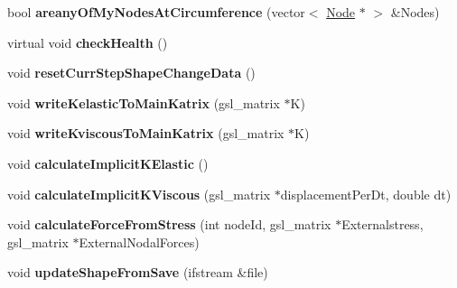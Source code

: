 \begin{DoxyCompactItemize}
\item 
\hypertarget{classShapeBase_ace99764b2dda719995b93cd96ae10b4f}{}bool {\bfseries areany\+Of\+My\+Nodes\+At\+Circumference} (vector$<$ \hyperlink{classNode}{Node} $\ast$ $>$ \&Nodes)\label{classShapeBase_ace99764b2dda719995b93cd96ae10b4f}

\item 
\hypertarget{classShapeBase_adb6927dd05e3f6aa1c5ac5d32a30b5da}{}virtual void {\bfseries check\+Health} ()\label{classShapeBase_adb6927dd05e3f6aa1c5ac5d32a30b5da}

\item 
\hypertarget{classShapeBase_a3c08833714950163efbf15f9b1c26765}{}void {\bfseries reset\+Curr\+Step\+Shape\+Change\+Data} ()\label{classShapeBase_a3c08833714950163efbf15f9b1c26765}

\item 
\hypertarget{classShapeBase_a2bfdde187477364a5a0e2220ea6b2e0e}{}void {\bfseries write\+Kelastic\+To\+Main\+Katrix} (gsl\+\_\+matrix $\ast$K)\label{classShapeBase_a2bfdde187477364a5a0e2220ea6b2e0e}

\item 
\hypertarget{classShapeBase_a388d38c2d6588c7ddf622f1deed53853}{}void {\bfseries write\+Kviscous\+To\+Main\+Katrix} (gsl\+\_\+matrix $\ast$K)\label{classShapeBase_a388d38c2d6588c7ddf622f1deed53853}

\item 
\hypertarget{classShapeBase_a922c41864d4826725cc72089046f818c}{}void {\bfseries calculate\+Implicit\+K\+Elastic} ()\label{classShapeBase_a922c41864d4826725cc72089046f818c}

\item 
\hypertarget{classShapeBase_a20c23d30b7f9f3bc7ed2fde542401aeb}{}void {\bfseries calculate\+Implicit\+K\+Viscous} (gsl\+\_\+matrix $\ast$displacement\+Per\+Dt, double dt)\label{classShapeBase_a20c23d30b7f9f3bc7ed2fde542401aeb}

\item 
\hypertarget{classShapeBase_a6a9f16ddb320974584323d78ca4aec9c}{}void {\bfseries calculate\+Force\+From\+Stress} (int node\+Id, gsl\+\_\+matrix $\ast$Externalstress, gsl\+\_\+matrix $\ast$External\+Nodal\+Forces)\label{classShapeBase_a6a9f16ddb320974584323d78ca4aec9c}

\item 
\hypertarget{classShapeBase_ae5a4fc509efc12d24cf90ea71dee3c27}{}void {\bfseries update\+Shape\+From\+Save} (ifstream \&file)\label{classShapeBase_ae5a4fc509efc12d24cf90ea71dee3c27}


\end{DoxyCompactItemize}
